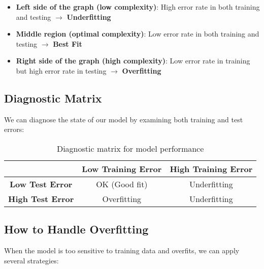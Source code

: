 \documentclass[11pt,a4paper]{article}
\theoremstyle{definition}
\theoremstyle{plain}
\theoremstyle{remark}
\begin{document}
\begin{itemize}
    \item \textbf{Left side of the graph (low complexity)}: High error rate in both training and testing $\rightarrow$ \textbf{Underfitting}
    \item \textbf{Middle region (optimal complexity)}: Low error rate in both training and testing $\rightarrow$ \textbf{Best Fit}
    \item \textbf{Right side of the graph (high complexity)}: Low error rate in training but high error rate in testing $\rightarrow$ \textbf{Overfitting}
\end{itemize}

\subsection{Diagnostic Matrix}

We can diagnose the state of our model by examining both training and test errors:

\begin{table}[h]
\centering
\begin{tabular}{|c|c|c|}
\hline
 & \textbf{Low Training Error} & \textbf{High Training Error} \\
\hline
\textbf{Low Test Error} & OK (Good fit) & Underfitting \\
\hline
\textbf{High Test Error} & Overfitting & Underfitting \\
\hline
\end{tabular}
\caption{Diagnostic matrix for model performance}
\end{table}

\subsection{How to Handle Overfitting}

When the model is too sensitive to training data and overfits, we can apply several strategies:
\end{document}
